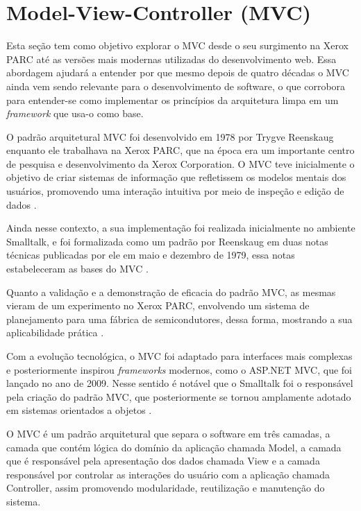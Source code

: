 \section{Model-View-Controller (MVC)}

    \par Esta seção tem como objetivo explorar o MVC desde o seu surgimento na Xerox PARC até as versões mais modernas utilizadas do desenvolvimento web. Essa abordagem ajudará a entender por que mesmo depois de quatro décadas o MVC ainda vem sendo relevante para o desenvolvimento de software, o que corrobora para entender-se como implementar os princípios da arquitetura limpa em um \textit{framework} que usa-o como base.
    
    \par O padrão arquitetural MVC foi desenvolvido em 1978 por Trygve Reenskaug enquanto ele trabalhava na Xerox PARC, que na época era um importante centro de pesquisa e desenvolvimento da Xerox Corporation. O MVC teve inicialmente o objetivo de criar sistemas de informação que refletissem os modelos mentais dos usuários, promovendo uma interação intuitiva por meio de inspeção e edição de dados \cite[p.~1]{artigo:reenskaug:2003}.
        
    \par Ainda nesse contexto, a sua implementação foi realizada inicialmente no ambiente Smalltalk, e foi formalizada como um padrão por Reenskaug em duas notas técnicas publicadas por ele em maio e dezembro de 1979, essa notas estabeleceram as bases do MVC \cite{artigo:reenskaug:1979}.
    
    \par Quanto a validação e a demonstração de eficacia do padrão MVC, as mesmas vieram de um experimento no Xerox PARC, envolvendo um sistema de planejamento para uma fábrica de semicondutores, dessa forma, mostrando a sua aplicabilidade prática \cite{artigo:reenskaug:2003}.
    
    \par Com a evolução tecnológica, o MVC foi adaptado para interfaces mais complexas e posteriormente inspirou \textit{frameworks} modernos, como o ASP.NET MVC, que foi lançado no ano de 2009. Nesse sentido é notável  que o Smalltalk foi o responsável pela criação do padrão MVC, que posteriormente se tornou amplamente adotado em sistemas orientados a objetos \cite{artigo:deacon:2009}.
    

    \par O MVC é um padrão arquitetural que separa o software em três camadas, a camada que contém lógica do domínio da aplicação chamada Model, a camada que é responsável pela apresentação dos dados chamada View e a camada responsável por controlar as interações do usuário com a aplicação chamada Controller, assim promovendo modularidade, reutilização e manutenção do sistema\cite{artigo:reenskaug:2003}.

